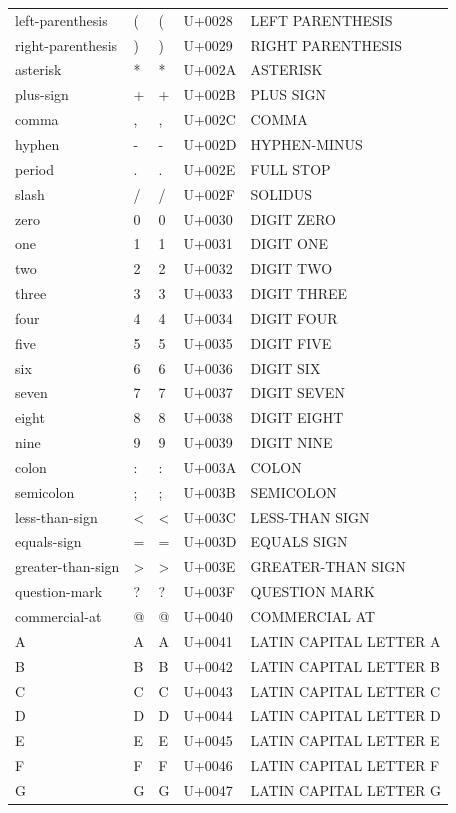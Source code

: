\documentclass{article}
\begin{document}
\begin{tabular}{lllll}
left-parenthesis & ( & ( & U+0028 & LEFT PARENTHESIS \\
right-parenthesis & ) & ) & U+0029 & RIGHT PARENTHESIS \\
asterisk & * & * & U+002A & ASTERISK \\
plus-sign & + & + & U+002B & PLUS SIGN \\
comma & , & , & U+002C & COMMA \\
hyphen & - & - & U+002D & HYPHEN-MINUS \\
period & . & . & U+002E & FULL STOP \\
slash & / & / & U+002F & SOLIDUS \\
zero & 0 & 0 & U+0030 & DIGIT ZERO \\
one & 1 & 1 & U+0031 & DIGIT ONE \\
two & 2 & 2 & U+0032 & DIGIT TWO \\
three & 3 & 3 & U+0033 & DIGIT THREE \\
four & 4 & 4 & U+0034 & DIGIT FOUR \\
five & 5 & 5 & U+0035 & DIGIT FIVE \\
six & 6 & 6 & U+0036 & DIGIT SIX \\
seven & 7 & 7 & U+0037 & DIGIT SEVEN \\
eight & 8 & 8 & U+0038 & DIGIT EIGHT \\
nine & 9 & 9 & U+0039 & DIGIT NINE \\
colon & : & : & U+003A & COLON \\
semicolon & ; & ; & U+003B & SEMICOLON \\
less-than-sign & < & < & U+003C & LESS-THAN SIGN \\
equals-sign & = & = & U+003D & EQUALS SIGN \\
greater-than-sign & > & > & U+003E & GREATER-THAN SIGN \\
question-mark & ? & ? & U+003F & QUESTION MARK \\
commercial-at & @ & @ & U+0040 & COMMERCIAL AT \\
A & A & A & U+0041 & LATIN CAPITAL LETTER A \\
B & B & B & U+0042 & LATIN CAPITAL LETTER B \\
C & C & C & U+0043 & LATIN CAPITAL LETTER C \\
D & D & D & U+0044 & LATIN CAPITAL LETTER D \\
E & E & E & U+0045 & LATIN CAPITAL LETTER E \\
F & F & F & U+0046 & LATIN CAPITAL LETTER F \\
G & G & G & U+0047 & LATIN CAPITAL LETTER G \\

\end{tabular}
\end{document}
